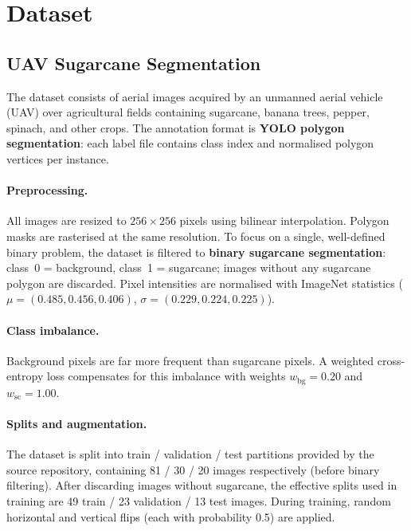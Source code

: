 \documentclass[12pt,a4paper]{article}
\theoremstyle{definition}
\begin{document}
\section{Dataset}

\subsection{UAV Sugarcane Segmentation}

The dataset consists of aerial images acquired by an unmanned aerial vehicle
(UAV) over agricultural fields containing sugarcane, banana trees, pepper,
spinach, and other crops.  The annotation format is \textbf{YOLO polygon
segmentation}: each label file contains class index and normalised polygon
vertices per instance.

\paragraph{Preprocessing.}
All images are resized to $256 \times 256$ pixels using bilinear
interpolation.  Polygon masks are rasterised at the same resolution.
To focus on a single, well-defined binary problem, the dataset is filtered
to \textbf{binary sugarcane segmentation}: class~0 = background, class~1 =
sugarcane; images without any sugarcane polygon are discarded.
Pixel intensities are normalised with ImageNet statistics
($\mu = (0.485, 0.456, 0.406)$, $\sigma = (0.229, 0.224, 0.225)$).

\paragraph{Class imbalance.}
Background pixels are far more frequent than sugarcane pixels.  A weighted
cross-entropy loss compensates for this imbalance with weights
$w_{\text{bg}} = 0.20$ and $w_{\text{sc}} = 1.00$.

\paragraph{Splits and augmentation.}
The dataset is split into train / validation / test partitions provided by
the source repository, containing 81 / 30 / 20 images respectively (before
binary filtering).  After discarding images without sugarcane, the effective
splits used in training are 49 train / 23 validation / 13 test images.
During training, random horizontal and vertical flips (each with probability
0.5) are applied.
\end{document}
